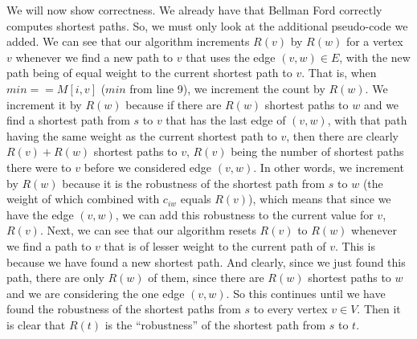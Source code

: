 \documentclass{article}
\begin{document}
    We will now show correctness. We already have that Bellman Ford correctly
    computes shortest paths. So, we must only look at the additional pseudo-code
    we added. We can see that our algorithm increments
    $R(v)$ by $R(w)$ for a vertex $v$ whenever we find a new path to $v$ that uses
    the edge $(v,w) \in E$, with the new path being of equal weight to the current
    shortest path to $v$.
    That is, when $min == M[i,v]$ ($min$ from line 9), we increment the count by $R(w)$. We
    increment it by $R(w)$ because if there are $R(w)$ shortest paths to $w$ and
    we find a shortest path from $s$ to $v$ that has the last edge of $(v,w)$,
    with that path having the same weight as the current shortest path to $v$,
    then there are clearly $R(v) + R(w)$ shortest paths to $v$, $R(v)$ being the
    number of shortest paths there were to $v$ before we considered edge
    $(v,w)$. In other words, we increment by $R(w)$ because it is the
    robustness of the shortest path from $s$ to $w$ (the weight of which
    combined with $c_{iw}$ equals $R(v)$), which means that since we
    have the edge $(v,w)$, we can add this robustness to the current value for
    $v$, $R(v)$.
    Next, we can
    see that our algorithm resets $R(v)$ to $R(w)$ whenever we find a path to $v$
    that is of lesser weight to the current path of $v$. This is because we have
    found a new shortest path. And clearly, since we just found this path,
    there are only $R(w)$ of them, since there are $R(w)$ shortest paths to $w$
    and we are considering the one edge $(v,w)$. So this continues until we have
    found the robustness of the shortest paths from $s$ to every vertex $v \in
    V$. Then it is clear that $R(t)$ is the ``robustness'' of the shortest path
    from $s$ to $t$.
    \newpage

\end{document}
